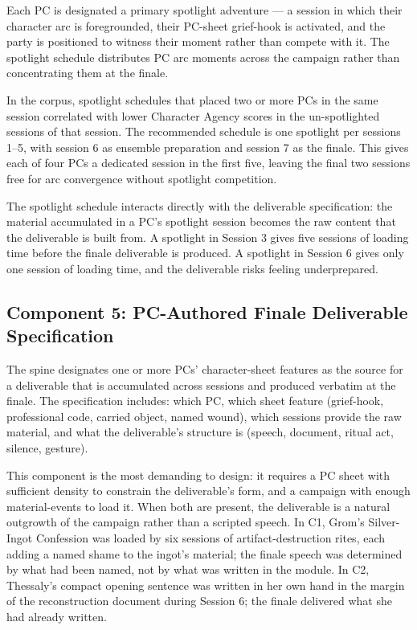 Each PC is designated a primary spotlight adventure --- a session in which their
character arc is foregrounded, their PC-sheet grief-hook is activated, and the
party is positioned to witness their moment rather than compete with it. The
spotlight schedule distributes PC arc moments across the campaign rather than
concentrating them at the finale.

In the corpus, spotlight schedules that placed two or more PCs in the same session
correlated with lower Character Agency scores in the un-spotlighted sessions of
that session. The recommended schedule is one spotlight per sessions 1--5, with
session 6 as ensemble preparation and session 7 as the finale. This gives each
of four PCs a dedicated session in the first five, leaving the final two sessions
free for arc convergence without spotlight competition.

The spotlight schedule interacts directly with the deliverable specification:
the material accumulated in a PC's spotlight session becomes the raw content
that the deliverable is built from. A spotlight in Session 3 gives five sessions
of loading time before the finale deliverable is produced. A spotlight in Session 6
gives only one session of loading time, and the deliverable risks feeling
underprepared.

\subsection{Component 5: PC-Authored Finale Deliverable Specification}

The spine designates one or more PCs' character-sheet features as the source
for a deliverable that is accumulated across sessions and produced verbatim
at the finale. The specification includes: which PC, which sheet feature
(grief-hook, professional code, carried object, named wound), which sessions
provide the raw material, and what the deliverable's structure is (speech,
document, ritual act, silence, gesture).

This component is the most demanding to design: it requires a PC sheet with
sufficient density to constrain the deliverable's form, and a campaign with
enough material-events to load it. When both are present, the deliverable
is a natural outgrowth of the campaign rather than a scripted speech. In C1,
Grom's Silver-Ingot Confession was loaded by six sessions of artifact-destruction
rites, each adding a named shame to the ingot's material; the finale speech was
determined by what had been named, not by what was written in the module. In C2,
Thessaly's compact opening sentence was written in her own hand in the margin of
the reconstruction document during Session 6; the finale delivered what she had
already written.


